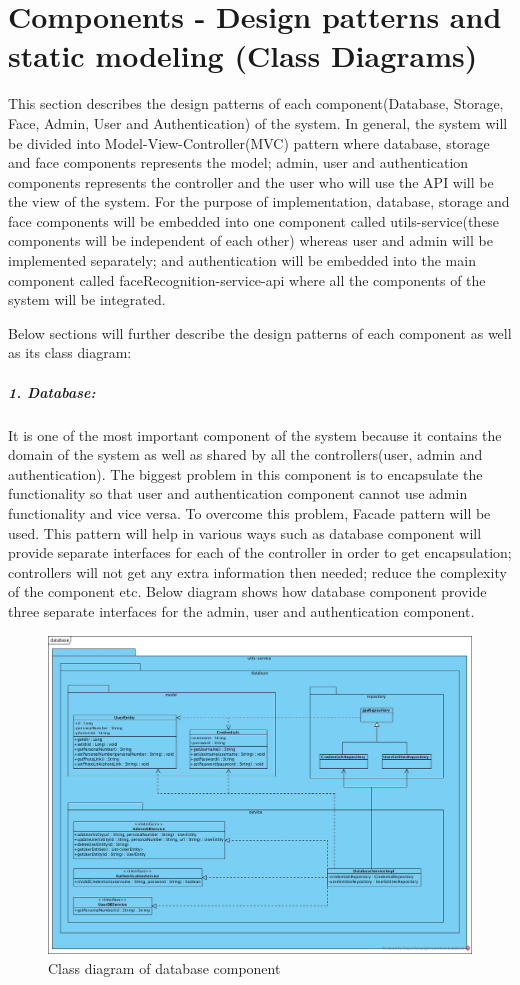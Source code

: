 \documentclass[a4paper,11pt]{article}
\begin{document}
\section{Components - Design patterns and static modeling (Class Diagrams)}
This section describes the design patterns of each component(Database, Storage, Face, Admin, User and Authentication) of the system. In general, the system will be divided into Model-View-Controller(MVC) pattern where database, storage and face components represents the model; admin, user and authentication components represents the controller and the user who will use the API will be the view of the system. For the purpose of implementation, database, storage and face components will be embedded into one component called utils-service(these components will be independent of each other) whereas user and admin will be implemented separately; and authentication will be embedded into the main component called faceRecognition-service-api where all the components of the system will be integrated.
\newline

\noindent
Below sections will further describe the design patterns of each component as well as its class diagram:

\subparagraph{1. Database: }It is one of the most important component of the system because it contains the domain of the system as well as shared by all the controllers(user, admin and authentication). The biggest problem in this component is to encapsulate the functionality so that user and authentication component cannot use admin functionality and vice versa. To overcome this problem, Facade pattern will be used. This pattern will help in various ways such as database component will provide separate interfaces for each of the controller in order to get encapsulation; controllers will not get any extra information then needed; reduce the complexity of the component etc. Below diagram shows how database component provide three separate interfaces for the admin, user and authentication component.

\begin{figure}[ht!]
    \centering
	\includegraphics[width=130mm]{ClassDiagrams/new/database.jpg}
	\caption{Class diagram of database component}
\end{figure}
\end{document}
